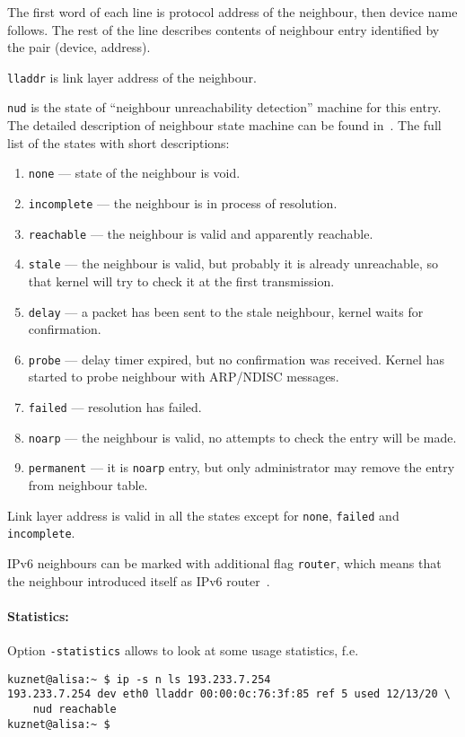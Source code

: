 The first word of each line is protocol address of the neighbour,
then device name follows. The rest of the line describes contents of
neighbour entry identified by the pair (device, address).

\verb|lladdr| is link layer address of the neighbour.

\verb|nud| is the state of ``neighbour unreachability detection'' machine
for this entry. The detailed description of neighbour
state machine can be found in~\cite{RFC-NDISC}. The full list 
of the states with short descriptions:

\begin{enumerate}
\item\verb|none| --- state of the neighbour is void.
\item\verb|incomplete| --- the neighbour is in process of resolution.
\item\verb|reachable| --- the neighbour is valid and apparently reachable.
\item\verb|stale| --- the neighbour is valid, but probably it is already
unreachable, so that kernel will try to check it at the first transmission.
\item\verb|delay| --- a packet has been sent to the stale neighbour, kernel waits
for confirmation.
\item\verb|probe| --- delay timer expired, but no confirmation was received.
Kernel has started to probe neighbour with ARP/NDISC messages.
\item\verb|failed| --- resolution has failed.
\item\verb|noarp| --- the neighbour is valid, no attempts to check the entry
will be made.
\item\verb|permanent| --- it is \verb|noarp| entry, but only administrator
may remove the entry from neighbour table.
\end{enumerate}

Link layer address is valid in all the states except for \verb|none|,
\verb|failed| and \verb|incomplete|.

IPv6 neighbours can be marked with additional flag \verb|router|,
which means that the neighbour introduced itself as IPv6 router~\cite{RFC-NDISC}.

\paragraph{Statistics:} Option \verb|-statistics| allows to look at some usage
statistics, f.e.\

\begin{verbatim}
kuznet@alisa:~ $ ip -s n ls 193.233.7.254
193.233.7.254 dev eth0 lladdr 00:00:0c:76:3f:85 ref 5 used 12/13/20 \
    nud reachable
kuznet@alisa:~ $ 
\end{verbatim}

